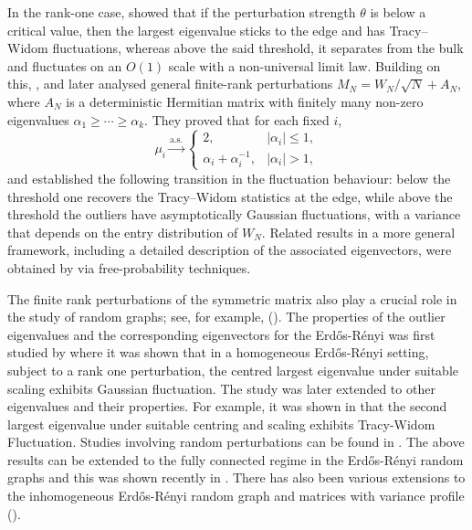\documentclass[11pt, reqno]{amsart}
\numberwithin{equation}{section}
\begin{document}
 In the rank-one case, \cite{feral2007largest} showed that if the perturbation strength $\theta$ is below a critical value, then the largest eigenvalue sticks to the edge and has Tracy–Widom fluctuations, whereas above the said threshold, it separates from the bulk and fluctuates on an $O(1)$ scale with a non-universal limit law. Building on this, \cite{capitaine2009largest}, and later \cite{pizzo2013finite} analysed general finite-rank perturbations $M_N = W_N/\sqrt{N} + A_N$, where $A_N$ is a deterministic Hermitian matrix with finitely many non-zero eigenvalues $\alpha_1 \ge \cdots \ge \alpha_k$. They proved that for each fixed $i$,
\[
  \mu_i \xrightarrow{\text{a.s.}}
  \begin{cases}
    2, & |\alpha_i| \le 1, \\
    \alpha_i + \alpha_i^{-1}, & |\alpha_i| > 1,
  \end{cases}
\]
and established the following transition in the fluctuation behaviour: below the threshold one recovers the Tracy–Widom statistics at the edge, while above the threshold the outliers have asymptotically Gaussian fluctuations, with a variance that depends on the entry distribution of $W_N$. Related results in a more general framework, including a detailed description of the associated eigenvectors, were obtained by \cite{benaych2011eigenvalues} via free-probability techniques.


 The finite rank perturbations of the symmetric matrix also play a crucial role in the study of random graphs; see, for example,  (\cite{furedi1981eigenvalues}). The properties of the outlier eigenvalues and the corresponding eigenvectors for the Erd\H{o}s-R\'enyi was first studied by \cite{erdHos2013spectral} where it was shown that in a homogeneous Erd\H{o}s-R\'enyi setting, subject to a rank one perturbation, the centred largest eigenvalue under suitable scaling exhibits Gaussian fluctuation. The study was later extended to other eigenvalues and their properties. For example, it was shown in \cite{erdHos2012spectral} that the second largest eigenvalue under suitable centring and scaling exhibits Tracy-Widom Fluctuation. Studies involving random perturbations can be found in \cite{ji2020gaussian}. The above results can be extended to the fully connected regime in the Erd\H{o}s-R\'enyi random graphs and this was shown recently in \cite{tikhomirov2021outliers}. There has also been various extensions to the inhomogeneous Erd\H{o}s-R\'enyi random graph and matrices with variance profile (\cite{chakrabarty2020eigenvalues, boursier2024large, ajanki2017universality}).
\end{document}
